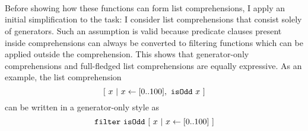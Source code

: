 \documentclass[12pt,a4paper,twoside,openright]{report}
\begin{document}
\begin{code}
\> \AgdaSymbol{:} \AgdaSymbol{\{} \AgdaSymbol{:} \AgdaSymbol{\}}   \AgdaSymbol{(} \AgdaSymbol{)}   \<%
\\
\> \AgdaInductiveConstructor{[]} \AgdaSymbol{=} \AgdaInductiveConstructor{[]}\<%
\\
\> \AgdaSymbol{(}  \AgdaSymbol{)} \AgdaSymbol{=}  \AgdaFunction{++}  \<%
\\
%
\\
\> \AgdaSymbol{:} \AgdaSymbol{\{}  \AgdaSymbol{:} \AgdaSymbol{\}}     \AgdaSymbol{(}   \AgdaSymbol{)}   \<%
\\
\>   \AgdaSymbol{=}  \AgdaSymbol{(}  \AgdaSymbol{)}\<%
\\
%
\\
\> \AgdaSymbol{:} \AgdaSymbol{\{} \AgdaSymbol{:} \AgdaSymbol{\}}     \<%
\\
\>  \AgdaSymbol{=} \AgdaFunction{[}  \AgdaFunction{]}\<%
\end{code}

Before showing how these functions can form list comprehensions, I apply an initial simplification to the task: I consider list comprehensions that consist solely of generators. Such an assumption is valid because predicate clauses present inside comprehensions can always be converted to filtering functions which can be applied outside the comprehension. This shows that generator-only comprehensions and full-fledged list comprehensions are equally expressive. As an example, the list comprehension
$$[\ x\ |\ x \leftarrow [0..100],\ \textrm{\tt isOdd}\ x\ ]$$
can be written in a generator-only style as
$${\tt filter\ isOdd}\ [\ x\ |\ x \leftarrow [0..100]\ ]$$
\end{document}
